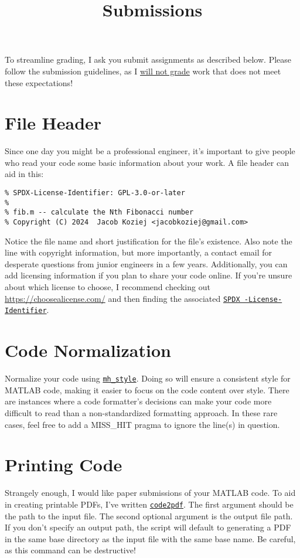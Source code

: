 \documentclass{article}
\title{Submissions}
\begin{document}
\renderTitle

\noindent
To streamline grading, I ask you submit assignments as described below.
Please follow the submission guidelines, as I \underline{will not grade}
work that does not meet these expectations!

\section{File Header}

Since one day you might be a professional engineer, it's important to
give people who read your code some basic information about your work. A
file header can aid in this:

\begin{verbatim}
% SPDX-License-Identifier: GPL-3.0-or-later
%
% fib.m -- calculate the Nth Fibonacci number
% Copyright (C) 2024  Jacob Koziej <jacobkoziej@gmail.com>
\end{verbatim}

\noindent
Notice the file name and short justification for the file's existence.
Also note the line with copyright information, but more importantly, a
contact email for desperate questions from junior engineers in a few
years.  Additionally, you can add licensing information if you plan to
share your code online.  If you're unsure about which license to choose,
I recommend checking out \url{https://choosealicense.com/} and then
finding the associated \href{https://spdx.org/licenses/}{\texttt{SPDX%
-License-Identifier}}.

\section{Code Normalization}

Normalize your code using \href{https://florianschanda.github.io/%
miss_hit/style_checker.html}{\texttt{mh\_style}}.  Doing so will ensure
a consistent style for MATLAB code, making it easier to focus on the
code content over style.  There are instances where a code formatter's
decisions can make your code more difficult to read than a
non-standardized formatting approach.  In these rare cases, feel free to
add a MISS\_HIT pragma to ignore the line(s) in question.

\section{Printing Code}

Strangely enough, I would like paper submissions of your MATLAB code.
To aid in creating printable PDFs, I've written \href{https://github.%
com/jacobkoziej/jk-ece210/blob/master/bin/code2pdf}{\texttt{code2pdf}}.
The first argument should be the path to the input file.  The second
optional argument is the output file path.  If you don't specify an
output path, the script will default to generating a PDF in the same
base directory as the input file with the same base name.  Be careful,
as this command can be destructive!
\end{document}
